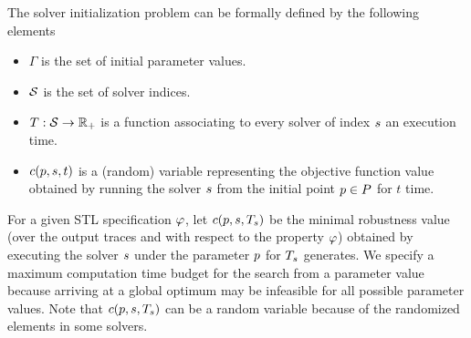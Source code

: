 The solver initialization problem can be formally defined by the following elements
\begin{itemize}
\item $\Gamma$ is the set of initial parameter values.
\item $\mathcal{S}$ is the set of solver indices.
\item $T : \mathcal{S} \to \mathbb{R}_+$ is a function associating to every solver of index $s$ an execution time.
\item $c(p, s, t)$ is a (random) variable representing the objective function value obtained by running the solver $s$ from the initial point $p \in P$ for $t$ time. 
\end{itemize}

For a given STL specification $\varphi$, let $c(p, s, T_{s})$ be the minimal robustness value (over the output traces and with respect to the property $\varphi$) obtained by executing the solver $s$ under the parameter $p$ for $T_{s}$ generates. We specify a maximum computation time budget for the search from a parameter value because arriving at a global optimum may be infeasible for all possible parameter values. Note that $c(p, s, T_{s})$ can be a random variable because of the randomized elements in some solvers. 


